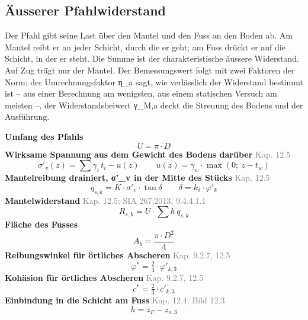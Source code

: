 \documentclass[11pt,a4paper]{article}
\newcommand{\normref}[1]{{\small\textcolor{gray}{#1}}}
\begin{document}
\subsection{Äusserer Pfahlwiderstand}
Der Pfahl gibt seine Last über den Mantel und den Fuss an den Boden ab. Am Mantel reibt er an jeder Schicht, durch die er geht; am Fuss drückt er auf die Schicht, in der er steht. Die Summe ist der charakteristische äussere Widerstand. Auf Zug trägt nur der Mantel. Der Bemessungswert folgt mit zwei Faktoren der Norm: der Umrechnungsfaktor η\_a sagt, wie verlässlich der Widerstand bestimmt ist – aus einer Berechnung am wenigsten, aus einem statischen Versuch am meisten –, der Widerstandsbeiwert γ\_M,a deckt die Streuung des Bodens und der Ausführung.

\noindent\textbf{Umfang des Pfahls}
\begin{equation*}
U = \pi \cdot D
\end{equation*}
\noindent\textbf{Wirksame Spannung aus dem Gewicht des Bodens darüber} \hfill \normref{Kap. 12.5}
\begin{equation*}
\sigma'_v(z) = \sum \gamma_i \, t_i - u(z) \qquad u(z) = \gamma_w \cdot \max\left(0;\ z - t_w\right)
\end{equation*}
\noindent\textbf{Mantelreibung drainiert, σ'\_v in der Mitte des Stücks} \hfill \normref{Kap. 12.5}
\begin{equation*}
q_{s,k} = K \cdot \sigma'_v \cdot \tan\delta \qquad \delta = k_{\delta} \cdot \varphi'_k
\end{equation*}
\noindent\textbf{Mantelwiderstand} \hfill \normref{Kap. 12.5; SIA 267:2013, 9.4.4.1.1}
\begin{equation*}
R_{s,k} = U \cdot \sum h \, q_{s,k}
\end{equation*}
\noindent\textbf{Fläche des Fusses}
\begin{equation*}
A_b = \frac{\pi \cdot D^{2}}{4}
\end{equation*}
\noindent\textbf{Reibungswinkel für örtliches Abscheren} \hfill \normref{Kap. 9.2.7, 12.5}
\begin{equation*}
\varphi^{*} = \tfrac{2}{3} \cdot \varphi'_{k,3}
\end{equation*}
\noindent\textbf{Kohäsion für örtliches Abscheren} \hfill \normref{Kap. 9.2.7, 12.5}
\begin{equation*}
c^{*} = \tfrac{2}{3} \cdot c'_{k,3}
\end{equation*}
\noindent\textbf{Einbindung in die Schicht am Fuss} \hfill \normref{Kap. 12.4, Bild 12.3}
\begin{equation*}
h = z_F - z_{o,3}
\end{equation*}
\end{document}
